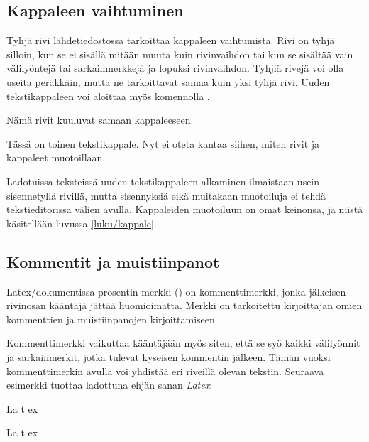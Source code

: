 \subsection{Kappaleen vaihtuminen}
\label{luku/kappaleen-vaihtuminen}

Tyhjä rivi lähdetiedostossa tarkoittaa kappaleen vaihtumista. Rivi on
tyhjä silloin, kun se ei sisällä mitään muuta kuin rivinvaihdon tai kun
se sisältää vain välilyöntejä tai sarkainmerkkejä ja lopuksi
rivinvaihdon. Tyhjiä rivejä voi olla useita peräkkäin, mutta ne
tarkoittavat samaa kuin yksi tyhjä rivi. Uuden tekstikappaleen voi
aloittaa myös komennolla .

\begin{koodilohkosis}
Nämä rivit kuuluvat
samaan kappaleeseen.

Tässä on toinen tekstikappale.
Nyt ei oteta kantaa siihen, miten
rivit ja kappaleet muotoillaan.
\end{koodilohkosis}

\noindent
Ladotuissa teksteissä uuden tekstikappaleen alkaminen ilmaistaan usein
sisennetyllä rivillä, mutta sisennyksiä eikä muitakaan muotoiluja ei
tehdä tekstieditorissa välien avulla. Kappaleiden muotoiluun on omat
keinonsa, ja niistä käsitellään luvussa \ref{luku/kappale}.

\subsection{Kommentit ja muistiinpanot}

Latex\-/dokumentissa prosentin merkki (\koodi{\%}) on kommenttimerkki,
jonka jälkeisen rivinosan kääntäjä jättää huomioimatta. Merkki on
tarkoitettu kirjoittajan omien kommenttien ja muistiinpanojen
kirjoittamiseen.

\begin{koodilohkosis}
\end{koodilohkosis}

\noindent
Kommenttimerkki vaikuttaa kääntäjään myös siten, että se syö kaikki
välilyönnit ja sarkainmerkit, jotka tulevat kyseisen kommentin jälkeen.
Tämän vuoksi kommenttimerkin avulla voi yhdistää eri riveillä olevan
tekstin. Seuraava esimerkki tuottaa ladottuna ehjän sanan \emph{Latex}:

\begin{koodilohkosis}
La%
  t%
    ex
\end{koodilohkosis}

\begin{tulossis}
  La%
    t%
      ex
\end{tulossis}

